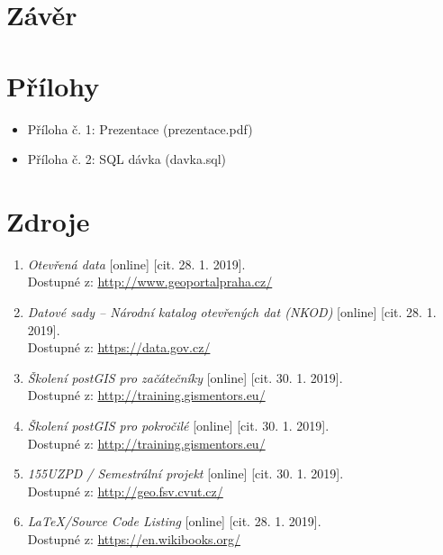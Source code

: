 \documentclass[a4paper, 12pt]{article}
\begin{document}
\clearpage

\section{Závěr}


\clearpage

\section{Přílohy} 

\begin{itemize}
\item Příloha č. 1: Prezentace (prezentace.pdf)
\item Příloha č. 2: SQL dávka (davka.sql)
\end{itemize}

\clearpage

\section{Zdroje}
\begin{enumerate}
\item  \textsl{Otevřená data} [online] [cit. 28. 1. 2019].\\
Dostupné z: \href{http://www.geoportalpraha.cz/cs/opendata?fbclid=IwAR3dvAz20d2Anu-nuD9A7wC3byHUKTzDGTnlgQrmi0tC-t-SbSqN7Q5x-sA#.XE8ymWlCfIX}{http://www.geoportalpraha.cz/}

\item  \textsl{Datové sady – Národní katalog otevřených dat (NKOD)} [online] [cit. 28. 1. 2019].\\
Dostupné z: \href{https://data.gov.cz/datov\%C3\%A9-sady?dotaz=&fbclid=IwAR2jg2NvnsjO7BuHAgbXSJwh6VXFbsuXs0FONcle5ZfdPpO86Z_2C3YUQsU}{https://data.gov.cz/}

\item  \textsl{Školení postGIS pro začátečníky} [online] [cit. 30. 1. 2019].\\
Dostupné z: \href{http://training.gismentors.eu/postgis-zacatecnik/}{http://training.gismentors.eu/}

\item  \textsl{Školení postGIS pro pokročilé} [online] [cit. 30. 1. 2019].\\
Dostupné z: \href{http://training.gismentors.eu/postgis-pokrocily/}{http://training.gismentors.eu/}

\item  \textsl{155UZPD / Semestrální projekt} [online] [cit. 30. 1. 2019].\\
Dostupné z: \href{http://geo.fsv.cvut.cz/gwiki/155UZPD_/_Semestr%C3%A1ln%C3%AD_projekt}{http://geo.fsv.cvut.cz/}

\item  \textsl{LaTeX/Source Code Listing} [online] [cit. 28. 1. 2019].\\
Dostupné z: \href{https://en.wikibooks.org/wiki/LaTeX/Source_Code_Listings}{https://en.wikibooks.org/}

\end{enumerate}
\end{document}
